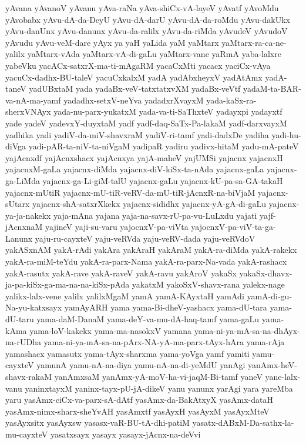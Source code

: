 {yAvana
yAvanoV
yAvanu
yAva-raNa
yAva-shiCx-vA-layeV
yAvatf
yAvoMdu
yAvobabx
yAvu-dA-da-DeyU
yAvu-dA-darU
yAvu-dA-da-roMdu
yAvu-dakUkx
yAvu-danUnx
yAvu-danunx
yAvu-da-ralilx
yAvu-da-riMda
yAvudeV
yAvudoV
yAvudu
yAvu-veM-dare
yAyx
ya
yaH
yaLida
yaM
yaMtarx
yaMtarx-ra-ca-ne-yalilx
yaMtarx-vAda
yaMtarx-vA-di-gaLu
yaMtarx-vane
yaRmA
yaba-lalxre
yabeVku
yacACx-satxrX-ma-ti-mAgaRM
yacaCxMti
yacacx
yaciCx-vAya
yacuCx-dadhx-BU-taleV
yacuCxkalxM
yadA
yadAbxheyxV
yadAtAmx
yadA-taneV
yadUBxtaM
yada
yadaBx-veV-tatxtatxvXM
yadaBx-veVtf
yadaM-ta-BAR-va-nA-ma-yamf
yadadhx-setxV-neYva
yadadxrXvayxM
yada-kaSx-ra-sherxVNAyx
yada-nu-parx-yukatxM
yada-va-ti-SaThxteV
yadayxpi
yadayxtf
yade
yadeV
yadevxY-duyxtaM
yadf
yadf-daq-SaTx-Pa-lakaM
yadf-darxvayxM
yadhika
yadi
yadiV-da-miV-shavxraM
yadiV-ri-tamf
yadi-dadxDe
yadiha
yadi-hu-diVga
yadi-pAR-ta-niV-ta-niVgaM
yadipaR
yadiru
yadivx-hitaM
yadu-mA-pateV
yajAcnxdf
yajAcnxshacx
yajAcnxya
yajA-maheV
yajUMSi
yajacnx
yajacnxH
yajacnxM-gaLa
yajacnx-diMda
yajacnx-diV-kiSx-ta-nAda
yajacnx-gaLa
yajacnx-ga-LiMda
yajacnx-ga-Li-giM-talU
yajacnx-gaLu
yajacnx-kU-pa-sa-GA-takaH
yajacnx-mUtiR
yajacnx-mU-tiR-veRV-da-mU-tiR-jAcnxR-na-biVjaM
yajacnx-sUtarx
yajacnx-shA-satxrXkekx
yajacnx-sididhx
yajacnx-yA-gA-di-gaLu
yajacnx-ya-ja-nakekx
yaja-mAna
yajana
yaja-na-savx-rU-pa-vu-LuLxdu
yajati
yajf-jAcnxnaM
yajineV
yaji-su-varu
yajocnxV-pa-viVta
yajocnxV-pa-viV-ta-ga-Lanunx
yaju-ru-cayxteV
yaju-veRVda
yaju-veRV-dada
yaju-veRVdoV
yakASxnAM
yakA-rAdi
yakAra
yakAraH
yakAraM
yakA-ra-diMda
yakA-rakekx
yakA-ra-miM-teYdu
yakA-ra-parx-Nama
yakA-ra-parx-Na-vada
yakA-rashacx
yakA-rasutx
yakA-rave
yakA-raveV
yakA-ravu
yakAroV
yakaSx
yakaSx-dhavx-ja-pa-kiSx-ga-ma-na-na-kiSx-pAda
yakatxM
yakoSxV-shavx-rana
yalekx-nage
yalikx-lalx-vene
yalilx
yalilxMgaM
yamA
yamA-KAyxtaH
yamAdi
yamA-di-gu-Na-yu-katxsayx
yamAyARH
yama
yama-Bi-dheV-yashacx
yama-dU-tara
yama-dU-taru
yama-daM-DanaM
yama-deY-va-mu-dA-haq-tamf
yama-gaLu
yama-kAma
yama-loV-kakekx
yama-ma-nasokxV
yamana
yama-ni-ya-mA-sa-na-dhAyx-na-rUDha
yama-ni-ya-mA-sa-na-pArx-NA-yA-ma-parx-tAyx-hAra
yama-rAja
yamashacx
yamasutx
yama-tAyx-sharxma
yama-yoVga
yamf
yamiti
yamu-cayxteV
yamunA
yamu-nA-na-diya
yamu-nA-na-di-yeMdU
yanAgi
yanAmx-heV-shavx-rakaM
yanAmxsaM
yanAmx-yA-moV-ha-vi-jaqM-Bi-tamf
yaneV
yane-lalx-vanu
yaninxtayxM
yaninx-tayx-pU-jA-dikeV
yanu
yanunx
yarAgi
yara
yareMba
yaru
yasAmx-ciCx-va-parx-sA-dAtf
yasAmx-da-BakAtxyX
yasAmx-dataH
yasAmx-nimx-sharx-sheYvAH
yasAmxtf
yasAyxH
yasAyxM
yasAyxMteV
yasAyxsitx
yasAyxsw
yasasx-vaR-BU-tA-dhi-patiM
yasatx-dABxM-Da-sathx-la-mu-cayxteV
yasatxsayx
yasayx
yasayx-jAcnx-na-deVvi
}
